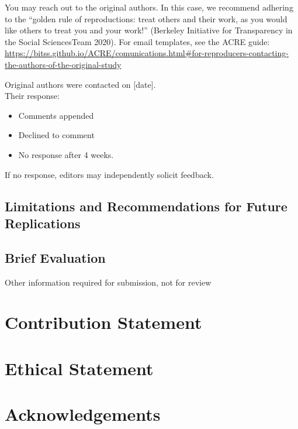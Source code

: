 \documentclass[
  letterpaper,
  DIV=11,
  numbers=noendperiod]{scrartcl}
\begin{document}
You may reach out to the original authors. In this case, we recommend
adhering to the ``golden rule of reproductions: treat others and their
work, as you would like others to treat you and your work!'' (Berkeley
Initiative for Transparency in the Social SciencesTeam 2020). For email
templates, see the ACRE guide:
\url{https://bitss.github.io/ACRE/comunications.html\#for-reproducers-contacting-the-authors-of-the-original-study}

Original authors were contacted on {[}date{]}.\\
Their response:\\

\begin{itemize}
\item[$\square$]
  Comments appended
\item[$\square$]
  Declined to comment
\item[$\square$]
  No response after 4 weeks.
\end{itemize}

If no response, editors may independently solicit feedback.

\subsection{Limitations and Recommendations for Future
Replications}\label{limitations-and-recommendations-for-future-replications}

\subsection{Brief Evaluation}\label{brief-evaluation}

\newpage{}

Other information required for submission, not for review

\section*{Contribution Statement}\label{contribution-statement}

\section*{Ethical Statement}\label{ethical-statement}

\section*{Acknowledgements}\label{acknowledgements}
\end{document}
